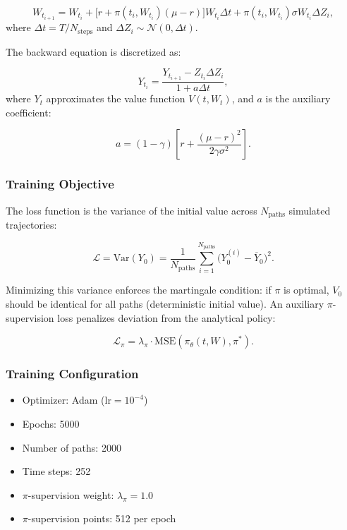 \documentclass[12pt,a4paper]{article}
\newcommand{\Var}{\text{Var}}
\newcommand{\mse}{\text{MSE}}
\newcommand{\loss}{\mathcal{L}}
\begin{document}
\begin{equation}
\label{eq:euler_maruyama}
W_{t_{i+1}} = W_{t_i} + \bigl[r + \pi(t_i, W_{t_i})(\mu - r)\bigr] W_{t_i} \Delta t + \pi(t_i, W_{t_i}) \sigma W_{t_i} \Delta Z_i,
\end{equation}
where $\Delta t = T / N_{\text{steps}}$ and $\Delta Z_i \sim \mathcal{N}(0, \Delta t)$.

The backward equation is discretized as:

\begin{equation}
\label{eq:backward_discrete}
Y_{t_i} = \frac{Y_{t_{i+1}} - Z_{t_i} \Delta Z_i}{1 + a \Delta t},
\end{equation}
where $Y_t$ approximates the value function $V(t, W_t)$, and $a$ is the auxiliary coefficient:

\begin{equation}
\label{eq:auxiliary_a}
a = (1-\gamma) \left[ r + \frac{(\mu - r)^2}{2 \gamma \sigma^2} \right].
\end{equation}

\subsubsection{Training Objective}

The loss function is the variance of the initial value across $N_{\text{paths}}$ simulated trajectories:

\begin{equation}
\label{eq:bsde_loss}
\loss = \Var(Y_0) = \frac{1}{N_{\text{paths}}} \sum_{i=1}^{N_{\text{paths}}} \bigl( Y_0^{(i)} - \overline{Y}_0 \bigr)^2.
\end{equation}

Minimizing this variance enforces the martingale condition: if $\pi$ is optimal, $V_0$ should be identical for all paths (deterministic initial value). An auxiliary $\pi$-supervision loss penalizes deviation from the analytical policy:

\begin{equation}
\label{eq:bsde_pi_loss}
\loss_{\pi} = \lambda_\pi \cdot \mse(\pi_\theta(t, W), \pi^*).
\end{equation}

\subsubsection{Training Configuration}

\begin{itemize}
    \item Optimizer: Adam ($\text{lr} = 10^{-4}$)
    \item Epochs: 5000
    \item Number of paths: 2000
    \item Time steps: 252
    \item $\pi$-supervision weight: $\lambda_\pi = 1.0$
    \item $\pi$-supervision points: 512 per epoch
\end{itemize}
\end{document}
